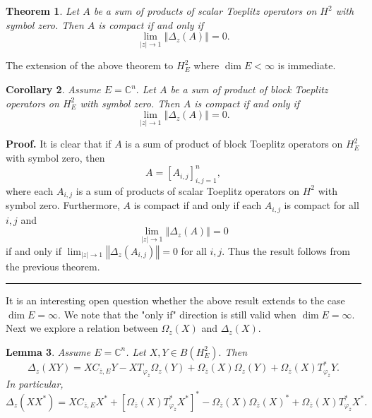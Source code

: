 \documentclass{article}%
\newtheorem{theorem}{Theorem}[section]
\newtheorem{corollary}[theorem]{Corollary}
\newtheorem{lemma}[theorem]{Lemma}
\newenvironment{proof}[1][Proof]{\noindent\textbf{#1.} }{\ \rule{0.5em}{0.5em}}
\begin{document}
\begin{theorem}
\cite{GuJFA,GuoZ2} Let $A$ be a sum of products of scalar Toeplitz operators
on $H^{2}$ with symbol zero. Then $A$ is compact if and only if
\[
\lim_{\left\vert z\right\vert \rightarrow1}\left\Vert \Delta_{z}(A)\right\Vert
=0.
\]

\end{theorem}

The extension of the above theorem to $H_{E}^{2}$ where $\dim E<\infty$ is immediate.

\begin{corollary}
\label{nesu}Assume $E=\mathbb{C}^{n}.$ Let $A$ be a sum of product of block
Toeplitz operators on $H_{E}^{2}$ with symbol zero. Then $A$ is compact if and
only if
\[
\lim_{\left\vert z\right\vert \rightarrow1}\left\Vert \Delta_{z}(A)\right\Vert
=0.
\]

\end{corollary}

\begin{proof}
It is clear that if $A$ is a sum of product of block Toeplitz operators on
$H_{E}^{2}$ with symbol zero, then%
\[
A=\left[  A_{i,j}\right]  _{i,j=1}^{n},
\]
where each $A_{i,j}$ is a sum of products of scalar Toeplitz operators on
$H^{2}$ with symbol zero. Furthermore, $A$ is compact if and only if each
$A_{i,j}$ is compact for all $i,j$ and
\[
\lim_{\left\vert z\right\vert \rightarrow1}\left\Vert \Delta_{z}(A)\right\Vert
=0
\]
if and only if $\lim_{\left\vert z\right\vert \rightarrow1}\left\Vert
\Delta_{z}(A_{i,j})\right\Vert =0$ for all $i,j.$ Thus the result follows from
the previous theorem.
\end{proof}

It is an interesting open question whether the above result extends to the
case $\dim E=\infty.$ We note that the "only if" direction is still valid when
$\dim E=\infty.$ Next we explore a relation between $\Omega_{z}(X)$ and
$\Delta_{z}(X).$

\begin{lemma}
\label{relation}Assume $E=\mathbb{C}^{n}$. Let $X,Y\in B(H_{E}^{2}).$ Then%
\[
\Delta_{z}(XY)=XC_{\overline{z},E}Y-XT_{\varphi_{\overline{z}}}\Omega
_{z}(Y)+\Omega_{\overline{z}}(X)\Omega_{z}(Y)+\Omega_{\overline{z}%
}(X)T_{\varphi_{\overline{z}}}^{\ast}Y.
\]
In particular,%
\[
\Delta_{z}(XX^{\ast})=XC_{\overline{z},E}X^{\ast}+\left[  \Omega_{\overline
{z}}(X)T_{\varphi_{\overline{z}}}^{\ast}X^{\ast}\right]  ^{\ast}%
-\Omega_{\overline{z}}(X)\Omega_{\overline{z}}(X)^{\ast}+\Omega_{\overline{z}%
}(X)T_{\varphi_{\overline{z}}}^{\ast}X^{\ast}.
\]

\end{lemma}
\end{document}
